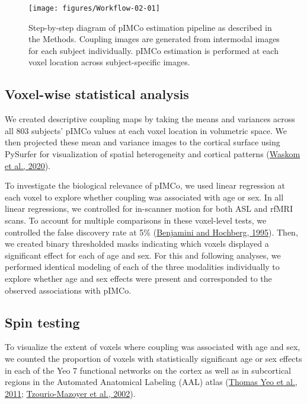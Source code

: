 \documentclass[
  12pt,
]{article}
\begin{document}
\begin{figure}
\texttt{[image: figures/Workflow-02-01]} \caption{Step-by-step diagram of pIMCo estimation pipeline as described in the Methods. Coupling images are generated from intermodal images for each subject individually. pIMCo estimation is performed at each voxel location across subject-specific images.}\label{fig:workflow}
\end{figure}

\hypertarget{voxel-wise-statistical-analysis}{%
\subsection{Voxel-wise statistical analysis}\label{voxel-wise-statistical-analysis}}

We created descriptive coupling maps by taking the means and variances across all 803 subjects' pIMCo values at each voxel location in volumetric space. We then projected these mean and variance images to the cortical surface using PySurfer for visualization of spatial heterogeneity and cortical patterns (\protect\hyperlink{ref-pysurfer}{Waskom et al., 2020}).

To investigate the biological relevance of pIMCo, we used linear regression at each voxel to explore whether coupling was associated with age or sex. In all linear regressions, we controlled for in-scanner motion for both ASL and rfMRI scans. To account for multiple comparisons in these voxel-level tests, we controlled the false discovery rate at 5\% (\protect\hyperlink{ref-benjaminiControllingFalseDiscovery1995}{Benjamini and Hochberg, 1995}). Then, we created binary thresholded masks indicating which voxels displayed a significant effect for each of age and sex. For this and following analyses, we performed identical modeling of each of the three modalities individually to explore whether age and sex effects were present and corresponded to the observed associations with pIMCo.

\hypertarget{spin-testing}{%
\subsection{Spin testing}\label{spin-testing}}

To visualize the extent of voxels where coupling was associated with age and sex, we counted the proportion of voxels with statistically significant age or sex effects in each of the Yeo 7 functional networks on the cortex as well as in subcortical regions in the Automated Anatomical Labeling (AAL) atlas (\protect\hyperlink{ref-thomasyeoOrganizationHumanCerebral2011}{Thomas Yeo et al., 2011}; \protect\hyperlink{ref-tzourio-mazoyerAutomatedAnatomicalLabeling2002}{Tzourio-Mazoyer et al., 2002}).
\end{document}
